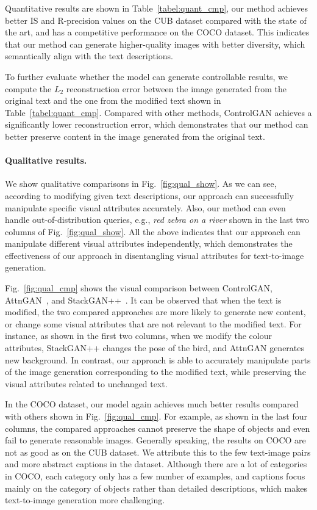 \documentclass{article}
\begin{document}
Quantitative results are shown in Table~\ref{tabel:quant_cmp}, our method achieves better IS and R-precision values on the CUB dataset compared with the state of the art, and has a competitive performance on the COCO dataset.
This indicates that our method can generate higher-quality images with better diversity, which semantically align with the text descriptions. 

To further evaluate whether the model can generate controllable results, we compute the $L_{2}$ reconstruction error \cite{nam2018text} between the image generated from the original text and the one from the modified text shown in Table~\ref{tabel:quant_cmp}.
Compared with other methods, ControlGAN achieves a significantly lower reconstruction error, which demonstrates that our method can better preserve content in the image generated from the original text.

\paragraph{Qualitative results.}
We show qualitative comparisons in Fig.~\ref{fig:qual_show}.
As we can see, according to modifying given text descriptions, our approach can successfully manipulate specific visual attributes accurately. 
Also, our method can even handle out-of-distribution queries, e.g., \emph{red zebra on a river} shown in the last two columns of Fig.~\ref{fig:qual_show}.
All the above indicates that our approach can manipulate different visual attributes independently, which demonstrates the effectiveness of our approach in disentangling visual attributes for text-to-image generation.


Fig.~\ref{fig:qual_cmp} shows the visual comparison between ControlGAN, AttnGAN~\cite{xu2018attngan}, and StackGAN++~\cite{zhang2018stackgan++}. It can be observed that when the text is modified, the two compared approaches are more likely to generate new content, or change some visual attributes that are not relevant to the modified text. {For instance, as shown in the first two columns, when we modify the colour attributes, StackGAN++ changes the pose of the bird, and AttnGAN generates new background.}
In contrast, our approach is able to accurately manipulate parts of the image generation corresponding to the modified text, while preserving the visual attributes related to unchanged text.

In the COCO dataset, our model again achieves much better results compared with others shown in Fig.~\ref{fig:qual_cmp}. {For example, as shown in the last four columns, the compared approaches cannot preserve the shape of objects and even fail to generate reasonable images.}
Generally speaking, the results on COCO are not as good as on the CUB dataset. We attribute this to the few text-image pairs and more abstract captions in the dataset. Although there are a lot of categories in COCO, each category only has a few number of examples, and captions focus mainly on the category of objects rather than detailed descriptions, which makes text-to-image generation more challenging. 
\end{document}
